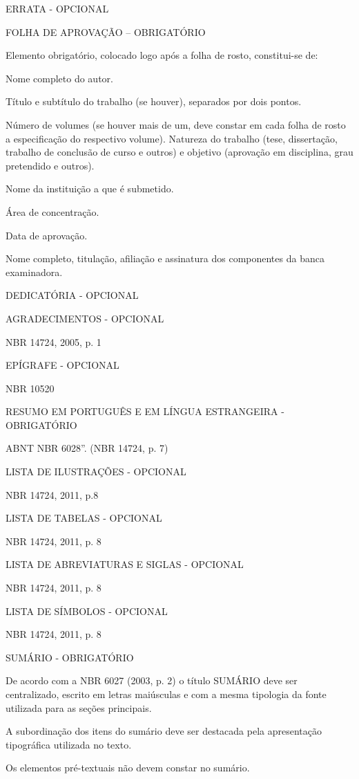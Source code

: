 ERRATA - OPCIONAL

FOLHA DE APROVAÇÃO – OBRIGATÓRIO

Elemento obrigatório, colocado logo após a folha de rosto, constitui-se de:

Nome completo do autor.

Título e subtítulo do trabalho (se houver), separados por dois pontos.

Número de volumes (se houver mais de um, deve constar em cada folha de rosto a especificação do respectivo volume).
 Natureza do trabalho (tese, dissertação, trabalho de conclusão de curso e outros) e objetivo (aprovação em disciplina, grau pretendido e outros).
 
 Nome da instituição a que é submetido.
 
 Área de concentração.
 
 Data de aprovação.
 
Nome completo, titulação, afiliação e assinatura dos componentes da banca
examinadora. 

DEDICATÓRIA - OPCIONAL 


AGRADECIMENTOS - OPCIONAL 

NBR 14724, 2005, p. 1

EPÍGRAFE - OPCIONAL

NBR 10520

RESUMO EM PORTUGUÊS E EM LÍNGUA ESTRANGEIRA - OBRIGATÓRIO

ABNT NBR 6028”. (NBR 14724, p. 7)

LISTA DE ILUSTRAÇÕES - OPCIONAL

NBR 14724, 2011, p.8

LISTA DE TABELAS - OPCIONAL 

NBR 14724, 2011, p. 8

LISTA DE ABREVIATURAS E SIGLAS - OPCIONAL 

NBR 14724, 2011, p. 8

LISTA DE SÍMBOLOS - OPCIONAL

NBR 14724, 2011, p. 8

SUMÁRIO - OBRIGATÓRIO

De acordo com a NBR 6027 (2003, p. 2) o título SUMÁRIO deve ser centralizado, escrito em letras maiúsculas e com a mesma tipologia da fonte utilizada para as seções principais.

A subordinação dos itens do sumário deve ser destacada pela apresentação
tipográfica utilizada no texto. 

Os elementos pré-textuais não devem constar no sumário.


